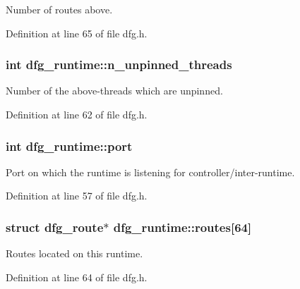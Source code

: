 Number of routes above. 



Definition at line 65 of file dfg.\-h.

\hypertarget{structdfg__runtime_ae9fb600da8228ad88cc06dfd863d980f}{
\subsubsection[{n\-\_\-unpinned\-\_\-threads}]{\setlength{\rightskip}{0pt plus 5cm}int dfg\-\_\-runtime\-::n\-\_\-unpinned\-\_\-threads}}\label{structdfg__runtime_ae9fb600da8228ad88cc06dfd863d980f}


Number of the above-\/threads which are unpinned. 



Definition at line 62 of file dfg.\-h.

\hypertarget{structdfg__runtime_a112f547c6913972fc06b6ff614995bf1}{
\subsubsection[{port}]{\setlength{\rightskip}{0pt plus 5cm}int dfg\-\_\-runtime\-::port}}\label{structdfg__runtime_a112f547c6913972fc06b6ff614995bf1}


Port on which the runtime is listening for controller/inter-\/runtime. 



Definition at line 57 of file dfg.\-h.

\hypertarget{structdfg__runtime_a1ad88caaa574b644201c1abccd94066a}{
\subsubsection[{routes}]{\setlength{\rightskip}{0pt plus 5cm}struct {\bf dfg\-\_\-route}$\ast$ dfg\-\_\-runtime\-::routes\mbox{[}64\mbox{]}}}\label{structdfg__runtime_a1ad88caaa574b644201c1abccd94066a}


Routes located on this runtime. 



Definition at line 64 of file dfg.\-h.


